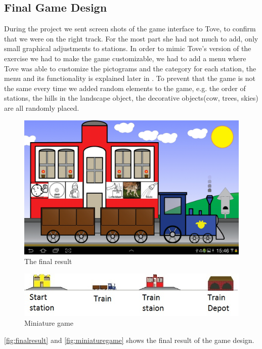 \subsection{Final Game Design}
\label{sec:designgameinterface}
During the project we sent screen shots of the game interface to Tove, to confirm that we were on the right track. For the most part she had not much to add, only small graphical adjustments to stations. 
In order to mimic Tove's version of the exercise we had to make the game customizable, we had to add a menu where Tove was able to customize the pictograms and the category for each station, the menu and its functionality is explained later in . To prevent that the game is not the same every time we added random elements to the game, e.g. the order of stations, the hills in the landscape object, the decorative objects(cow, trees, skies) are all randomly placed. 
\begin{figure}[H]
\centering
\includegraphics[width=0.9\linewidth]{img/screenshots/gamedesign1.jpg}%
\caption{The final result}
\label{fig:finalresult}
\end{figure}
\begin{figure}[H]
\centering
\includegraphics[width=0.9\linewidth]{img/screenshots/stations.jpg}%
\caption{Miniature game}
\label{fig:miniaturegame}
\end{figure}
\autoref{fig:finalresult} and \autoref{fig:miniaturegame} shows the final result of the game design. 
